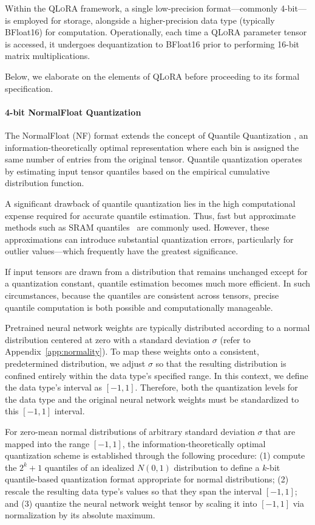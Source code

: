 Within the \textsc{QLoRA} framework, a single low-precision format—commonly 4-bit—is employed for storage, alongside a higher-precision data type (typically BFloat16) for computation. Operationally, each time a \textsc{QLoRA} parameter tensor is accessed, it undergoes dequantization to BFloat16 prior to performing 16-bit matrix multiplications.

Below, we elaborate on the elements of \textsc{QLoRA} before proceeding to its formal specification.

\paragraph{4-bit NormalFloat Quantization} The NormalFloat (NF) format extends the concept of Quantile Quantization \citep{dettmers2022optimizers}, an information-theoretically optimal representation where each bin is assigned the same number of entries from the original tensor. Quantile quantization operates by estimating input tensor quantiles based on the empirical cumulative distribution function.

A significant drawback of quantile quantization lies in the high computational expense required for accurate quantile estimation. Thus, fast but approximate methods such as SRAM quantiles~\citep{dettmers2022optimizers} are commonly used. However, these approximations can introduce substantial quantization errors, particularly for outlier values—which frequently have the greatest significance.

If input tensors are drawn from a distribution that remains unchanged except for a quantization constant, quantile estimation becomes much more efficient. In such circumstances, because the quantiles are consistent across tensors, precise quantile computation is both possible and computationally manageable.

Pretrained neural network weights are typically distributed according to a normal distribution centered at zero with a standard deviation $\sigma$ (refer to Appendix~\ref{app:normality}). To map these weights onto a consistent, predetermined distribution, we adjust $\sigma$ so that the resulting distribution is confined entirely within the data type's specified range. In this context, we define the data type's interval as $[-1, 1]$. Therefore, both the quantization levels for the data type and the original neural network weights must be standardized to this $[-1, 1]$ interval.

For zero-mean normal distributions of arbitrary standard deviation $\sigma$ that are mapped into the range $[-1, 1]$, the information-theoretically optimal quantization scheme is established through the following procedure: (1) compute the $2^k+1$ quantiles of an idealized $N(0, 1)$ distribution to define a $k$-bit quantile-based quantization format appropriate for normal distributions; (2) rescale the resulting data type's values so that they span the interval $[-1, 1]$; and (3) quantize the neural network weight tensor by scaling it into $[-1, 1]$ via normalization by its absolute maximum.

